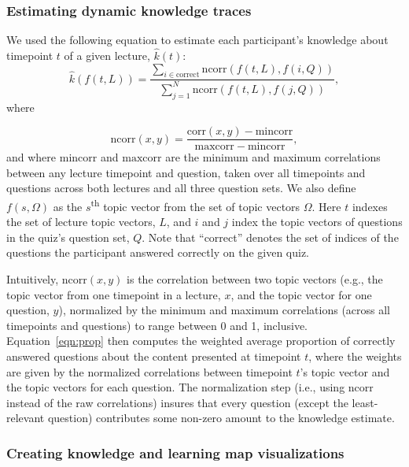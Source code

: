 \documentclass[10pt]{article}
\begin{document}
\subsubsection*{Estimating dynamic knowledge traces}\label{subsec:traces}

We used the following equation to estimate each participant's knowledge about
timepoint $t$ of a given lecture, $\hat{k}(t)$:
\begin{equation}
    \hat{k}\left(f(t, L)\right) = \frac{\sum_{i \in \mathrm{correct}}\mathrm{ncorr}\left(f(t, L), f(i, Q)\right)}{\sum_{j = 1}^N \mathrm{ncorr}\left(f(t, L), f(j, Q)\right)},
    \label{eqn:prop}
\end{equation}
where

\begin{equation}
    \mathrm{ncorr}(x, y) = \frac{\mathrm{corr}(x, y) - \mathrm{mincorr}}{\mathrm{maxcorr} - \mathrm{mincorr}},
\end{equation}
and where $\mathrm{mincorr}$ and $\mathrm{maxcorr}$ are the minimum and maximum
correlations between any lecture timepoint and question, taken over all
timepoints and questions across both lectures and all three question sets. We
also define $f(s, \Omega)$ as the $s$\textsuperscript{th} topic vector from the
set of topic vectors $\Omega$. Here $t$ indexes the set of lecture topic
vectors, $L$, and $i$ and $j$ index the topic vectors of questions in the
quiz's question set, $Q$. Note that ``correct'' denotes the set of indices of
the questions the participant answered correctly on the given quiz.

Intuitively, $\mathrm{ncorr}(x, y)$ is the correlation between two topic
vectors (e.g., the topic vector from one timepoint in a lecture, $x$, and the
topic vector for one question, $y$), normalized by the minimum and maximum
correlations (across all timepoints and questions) to range between 0 and 1,
inclusive. Equation~\ref{eqn:prop} then computes the weighted average
proportion of correctly answered questions about the content presented at
timepoint $t$, where the weights are given by the normalized correlations
between timepoint $t$'s topic vector and the topic vectors for each question.
The normalization step (i.e., using $\mathrm{ncorr}$ instead of the raw
correlations) insures that every question (except the least-relevant question)
contributes some non-zero amount to the knowledge estimate.

\subsubsection*{Creating knowledge and learning map visualizations}\label{subsec:knowledge-maps}
\end{document}
